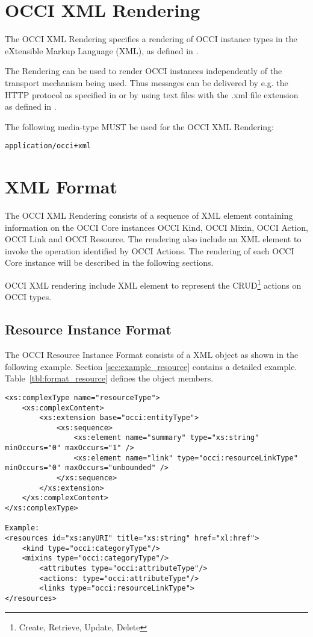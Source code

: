 \documentclass[10pt,a4paper]{article}
\begin{document}
\section{OCCI XML Rendering}

The OCCI XML Rendering specifies a rendering of OCCI instance types in
the eXtensible Markup Language (XML), as defined in \cite{w3c:xml11}.

The Rendering can be used to render OCCI instances independently of the
transport mechanism being used. Thus messages can be delivered by e.g. the HTTP
protocol as specified in \cite{occi:http_rendering} or by using text files with
the .xml file extension as defined in \cite{w3c:xml11}.

The following media-type MUST be used for the OCCI XML Rendering:

{\tt application/occi+xml}

\section{XML Format}
\label{sec:xml_format}

The OCCI XML Rendering consists of a sequence of XML element containing
information on the OCCI Core instances OCCI Kind, OCCI Mixin, OCCI
Action, OCCI Link and OCCI Resource. The rendering also include an XML
element to invoke the operation identified by OCCI Actions.
The rendering of each OCCI Core instance will be described in the
following sections.


OCCI XML rendering include XML element to represent the
CRUD\footnote{Create, Retrieve, Update, Delete} actions on OCCI types.

\subsection{Resource Instance Format}
\label{sec:format_resource}

The OCCI Resource Instance Format consists of a XML object as shown in the
following example. Section \ref{sec:example_resource} contains a detailed
example.
Table~\ref{tbl:format_resource} defines the object members.
\begin{lstlisting}
<xs:complexType name="resourceType">
	<xs:complexContent>
		<xs:extension base="occi:entityType">
			<xs:sequence>
				<xs:element name="summary" type="xs:string" minOccurs="0" maxOccurs="1" />
				<xs:element name="link" type="occi:resourceLinkType" minOccurs="0" maxOccurs="unbounded" />
			</xs:sequence>
		</xs:extension>
	</xs:complexContent>
</xs:complexType>

Example:
<resources id="xs:anyURI" title="xs:string" href="xl:href">
	<kind type="occi:categoryType"/>
	<mixins type="occi:categoryType"/>
        <attributes type="occi:attributeType"/>
        <actions: type="occi:attributeType"/>
        <links type="occi:resourceLinkType"> 
</resources>
\end{lstlisting}
\end{document}
